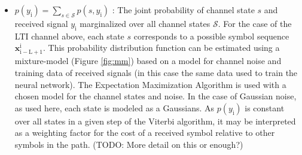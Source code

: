 \documentclass[12pt,a4paper]{report}
\begin{document}
\begin{itemize}
\item $p(y_{\mathrm{i}}) = \sum_{s \in \textit{$\mathcal{S}$}}p(s,y_{\mathrm{i}})$
: The joint probability of channel state $s$ and received signal $y_{\mathrm{i}}$ marginalized over all channel states $\mathcal{S}$. For the case of the LTI channel above, each state $s$ corresponds to a possible symbol sequence $\mathbf{x}_{\mathrm{i-L+1}}^{\mathrm{i}}$. This probability distribution function can be estimated using a mixture-model (Figure \ref{fig:mm}) based on a model for channel noise and training data of received signals (in this case the same data used to train the neural network). The Expectation Maximization Algorithm \cite{ng2000cs229} is used with a chosen model for the channel states and noise. In the case of Gaussian noise, as used here, each state is modeled as a Gaussians. As $p(y_{\mathrm{i}})$ is constant over all states in a given step of the Viterbi algorithm, it may be interpreted as a weighting factor for the cost of a received symbol relative to other symbols in the path. (TODO: More detail on this or enough?)
%
%




\end{itemize}
\end{document}
